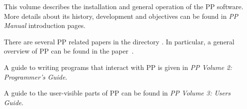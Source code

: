 
\preface

This volume describes the installation and general operation of the PP
software. More details about its history, development and objectives
can be found in {\em PP Manual} introduction pages.

There are several PP related papers in the directory .
In particular, a general overview of PP can be found in the
paper~\cite{IFIP.PP}.

A guide to writing programs that interact with PP is given in {\em PP
Volume 2: Programmer's Guide}.

A guide to the user-visible parts of PP can be found in {\em PP Volume
3: Users Guide}.

